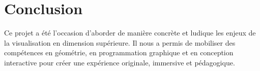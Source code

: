 \documentclass[11pt,a4paper]{article}
\begin{document}
\section{Conclusion}

Ce projet a été l’occasion d’aborder de manière concrète et ludique les enjeux de la visualisation en dimension supérieure. Il nous a permis de mobiliser des compétences en géométrie, en programmation graphique et en conception interactive pour créer une expérience originale, immersive et pédagogique.
\end{document}
